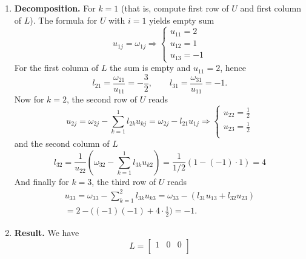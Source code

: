 \documentclass[../../../main.tex]{subfiles}
\begin{document}
\begin{enumerate}
    \item \textbf{Decomposition.}
          For $k=1$ (that is, compute first row of $U$ and first column of $L$). The formula for $U$  with $i=1$ yields empty sum
          \begin{equation*}
              u_{1j} = \omega_{1j}\Rightarrow
              \begin{cases}
                  u_{11}=2 \\u_{12}=1\\u_{13}=-1
              \end{cases}
          \end{equation*}
          For the first column of $L$ the sum is empty and $u_{11}=2$, hence
          \begin{equation*}
              l_{21} = \frac{\omega_{21}}{u_{11}} = -\frac{3}{2}, \qquad
              l_{31} = \frac{\omega_{31}}{u_{11}} = -1.
          \end{equation*}
          Now for $k=2$, the second row of $U$ reads
          \begin{equation*}
              u_{2j}=\omega_{2j}-\sum_{k=1 }^{1}l_{2k}u_{kj}=\omega_{2j}-l_{21}u_{1j}\Rightarrow
              \begin{cases}
                  u_{22} = \frac{1}{2}  \\
                  u_{23}  = \frac{1}{2} \\
              \end{cases}
          \end{equation*}
          and the second column of $L$
          \begin{equation*}
              l_{32} = \frac{1}{u_{22}} \left( \omega_{32} -\sum_{k=1 }^{1} l_{3k}u_{k2} \right)=\frac{1}{1/2}\left(1 - (-1)\cdot 1\right) = 4
          \end{equation*}
          And finally for $k=3$, the third row of $U$ reads
          \begin{multline*}
              u_{33} =\omega_{33}-\sum_{k=1 }^{2}l_{3k}u_{k3}= \omega_{33} - (l_{31}u_{13} + l_{32}u_{23})\\
               = 2 - \big( (-1)(-1) + 4\cdot \frac{1}{2} \big) = -1.
          \end{multline*}
    \item \textbf{Result.} We have
          \begin{equation*}
              L=\begin{bmatrix}
                  1            & 0 & 0 \\

\end{bmatrix}
\end{equation*}
\end{enumerate}
\end{document}
